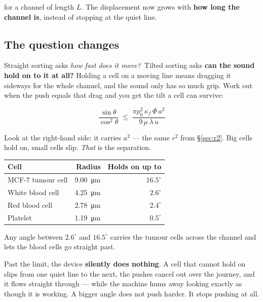 \documentclass[11pt,a4paper]{article}
\begin{document}
for a channel of length $L$. The displacement now grows with \textbf{how long
the channel is}, instead of stopping at the quiet line.

\subsection*{The question changes}

Straight sorting asks \emph{how fast does it move?}\ Tilted sorting asks
\textbf{can the sound hold on to it at all?} Holding a cell on a moving line
means dragging it sideways for the whole channel, and the sound only has so much
grip. Work out when the push equals that drag and you get the tilt a cell can
survive:

\begin{equation}
\frac{\sin\theta}{\cos^{2}\theta} \;\le\;
\frac{\pi p_0^2\,\kappa_f\,\Phi\,a^2}{9\,\mu\,\lambda\,u}
\label{eq:trap}
\end{equation}

Look at the right-hand side: it carries $a^2$ --- the same $r^2$ from
\S\ref{sec:r2}. Big cells hold on, small cells slip. \emph{That} is the
separation.

\begin{center}\small
\begin{tabular}{lrr}
\toprule
Cell & Radius & Holds on up to \\
\midrule
MCF-7 tumour cell & \SI{9.00}{\micro\metre} & $16.5^\circ$ \\
White blood cell & \SI{4.25}{\micro\metre} & $2.6^\circ$ \\
Red blood cell & \SI{2.78}{\micro\metre} & $2.4^\circ$ \\
Platelet & \SI{1.19}{\micro\metre} & $0.5^\circ$ \\
\bottomrule
\end{tabular}
\end{center}

Any angle between $2.6^\circ$ and $16.5^\circ$ carries the tumour cells across
the channel and lets the blood cells go straight past.

\begin{warnbox}
Past the limit, the device \textbf{silently does nothing}. A cell that cannot
hold on slips from one quiet line to the next, the pushes cancel out over the
journey, and it flows straight through --- while the machine hums away looking
exactly as though it is working. A bigger angle does not push harder. It stops
pushing at all.
\end{warnbox}
\end{document}
